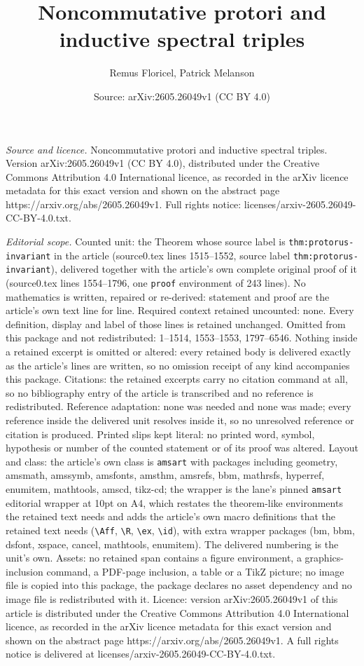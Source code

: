 \documentclass[10pt,a4paper]{amsart}
\title[Noncommutative protori and inductive spectral triples]{Noncommutative protori and inductive spectral triples}
\author{Remus Floricel, Patrick Melanson}
\date{Source: arXiv:2605.26049v1 (CC BY 4.0)}
\begin{document}
\maketitle

\noindent\emph{Source and licence.} Noncommutative protori and inductive spectral triples. Version arXiv:2605.26049v1 (CC BY 4.0), distributed under the Creative Commons Attribution 4.0 International licence, as recorded in the arXiv licence metadata for this exact version and shown on the abstract page https://arxiv.org/abs/2605.26049v1. Full rights notice: licenses/arxiv-2605.26049-CC-BY-4.0.txt.\par\smallskip

\noindent\textit{Editorial scope.} Counted unit: the Theorem whose source label is \texttt{thm:protorus-invariant} in the article (source0.tex lines 1515--1552, source label \texttt{thm:protorus-invariant}), delivered together with the article's own complete original proof of it (source0.tex lines 1554--1796, one \texttt{proof} environment of 243 lines). No mathematics is written, repaired or re-derived: statement and proof are the article's own text line for line. Required context retained uncounted: none. Every definition, display and label of those lines is retained unchanged. Omitted from this package and not redistributed: 1--1514, 1553--1553, 1797--6546. Nothing inside a retained excerpt is omitted or altered: every retained body is delivered exactly as the article's lines are written, so no omission receipt of any kind accompanies this package. Citations: the retained excerpts carry no citation command at all, so no bibliography entry of the article is transcribed and no reference is redistributed. Reference adaptation: none was needed and none was made; every reference inside the delivered unit resolves inside it, so no unresolved reference or citation is produced. Printed slips kept literal: no printed word, symbol, hypothesis or number of the counted statement or of its proof was altered. Layout and class: the article's own class is \texttt{amsart} with packages including geometry, amsmath, amssymb, amsfonts, amsthm, amsrefs, bbm, mathrsfs, hyperref, enumitem, mathtools, amscd, tikz-cd; the wrapper is the lane's pinned \texttt{amsart} editorial wrapper at 10pt on A4, which restates the theorem-like environments the retained text needs and adds the article's own macro definitions that the retained text needs (\texttt{\textbackslash Aff}, \texttt{\textbackslash R}, \texttt{\textbackslash ex}, \texttt{\textbackslash id}), with extra wrapper packages (bm, bbm, dsfont, xspace, cancel, mathtools, enumitem). The delivered numbering is the unit's own. Assets: no retained span contains a figure environment, a graphics-inclusion command, a PDF-page inclusion, a table or a TikZ picture; no image file is copied into this package, the package declares no asset dependency and no image file is redistributed with it. Licence: version arXiv:2605.26049v1 of this article is distributed under the Creative Commons Attribution 4.0 International licence, as recorded in the arXiv licence metadata for this exact version and shown on the abstract page https://arxiv.org/abs/2605.26049v1. A full rights notice is delivered at licenses/arxiv-2605.26049-CC-BY-4.0.txt. 
\end{document}
